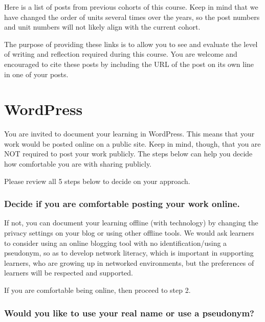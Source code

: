 \documentclass[
]{book}
\begin{document}
Here is a list of posts from previous cohorts of this course. Keep in mind that we have changed the order of units several times over the years, so the post numbers and unit numbers will not likely align with the current cohort.

The purpose of providing these links is to allow you to see and evaluate the level of writing and reflection required during this course. You are welcome and encouraged to cite these posts by including the URL of the post on its own line in one of your posts.

\hypertarget{wordpress}{%
\chapter*{WordPress}\label{wordpress}}

You are invited to document your learning in WordPress. This means that your work would be posted online on a public site. Keep in mind, though, that you are NOT required to post your work publicly. The steps below can help you decide how comfortable you are with sharing publicly.

Please review all 5 steps below to decide on your approach.

\hypertarget{decide-if-you-are-comfortable-posting-your-work-online.}{%
\subsection*{Decide if you are comfortable posting your work online.}\label{decide-if-you-are-comfortable-posting-your-work-online.}}

If not, you can document your learning offline (with technology) by changing the privacy settings on your blog or using other offline tools. We would ask learners to consider using an online blogging tool with no identification/using a pseudonym, so as to develop network literacy, which is important in supporting learners, who are growing up in networked environments, but the preferences of learners will be respected and supported.

If you are comfortable being online, then proceed to step 2.

\hypertarget{would-you-like-to-use-your-real-name-or-use-a-pseudonym}{%
\subsection*{Would you like to use your real name or use a pseudonym?}\label{would-you-like-to-use-your-real-name-or-use-a-pseudonym}}
\end{document}
